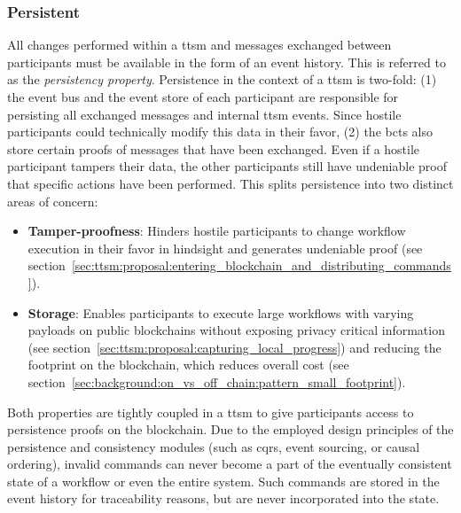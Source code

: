 \subsubsection{Persistent}
\label{sec:ttsm:properties:persistent}
All changes performed within a \gls{ttsm} and messages exchanged between participants must be available in the form of an event history. This is referred to as the \textit{persistency property}. Persistence in the context of a \gls{ttsm} is two-fold: (1) the event bus and the event store of each participant are responsible for persisting all exchanged messages and internal \gls{ttsm} events. Since hostile participants could technically modify this data in their favor, (2) the \glspl{bct} also store certain proofs of messages that have been exchanged. Even if a hostile participant tampers their data, the other participants still have undeniable proof that specific actions have been performed. This splits persistence into two distinct areas of concern:

\begin{itemize}
    \item \textbf{Tamper-proofness}: Hinders hostile participants to change workflow execution in their favor in hindsight and generates undeniable proof (see section~\ref{sec:ttsm:proposal:entering_blockchain_and_distributing_commands}).
    \item \textbf{Storage}: Enables participants to execute large workflows with varying payloads on public blockchains without exposing privacy critical information (see section~\ref{sec:ttsm:proposal:capturing_local_progress}) and reducing the footprint on the blockchain, which reduces overall cost (see section~\ref{sec:background:on_vs_off_chain:pattern_small_footprint}).
\end{itemize}

Both properties are tightly coupled in a \gls{ttsm} to give participants access to persistence proofs on the blockchain. Due to the employed design principles of the persistence and consistency modules (such as \gls{cqrs}, event sourcing, or causal ordering), invalid commands can never become a part of the eventually consistent state of a workflow or even the entire system. Such commands are stored in the event history for traceability reasons, but are never incorporated into the state.

